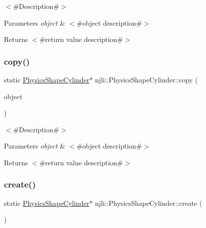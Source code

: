 $<$\#\+Description\#$>$


\begin{DoxyParams}{Parameters}
{\em object} & $<$\#object description\#$>$\\
\hline
\end{DoxyParams}
\begin{DoxyReturn}{Returns}
$<$\#return value description\#$>$ 
\end{DoxyReturn}
\mbox{\label{classnjli_1_1_physics_shape_cylinder_a0f46fea25774f8b6c9b5f11b662e2ea6}} 
\subsubsection{\texorpdfstring{copy()}{copy()}}
{\footnotesize\ttfamily static \mbox{\hyperlink{classnjli_1_1_physics_shape_cylinder}{Physics\+Shape\+Cylinder}}$\ast$ njli\+::\+Physics\+Shape\+Cylinder\+::copy (\begin{DoxyParamCaption}\item[{const \mbox{\hyperlink{classnjli_1_1_physics_shape_cylinder}{Physics\+Shape\+Cylinder}} \&}]{object }\end{DoxyParamCaption})\hspace{0.3cm}{\ttfamily [static]}}

$<$\#\+Description\#$>$


\begin{DoxyParams}{Parameters}
{\em object} & $<$\#object description\#$>$\\
\hline
\end{DoxyParams}
\begin{DoxyReturn}{Returns}
$<$\#return value description\#$>$ 
\end{DoxyReturn}
\mbox{\label{classnjli_1_1_physics_shape_cylinder_a1c47189018afd4ce17ebc2628ccf4288}} 
\subsubsection{\texorpdfstring{create()}{create()}\hspace{0.1cm}{\footnotesize\ttfamily [1/2]}}
{\footnotesize\ttfamily static \mbox{\hyperlink{classnjli_1_1_physics_shape_cylinder}{Physics\+Shape\+Cylinder}}$\ast$ njli\+::\+Physics\+Shape\+Cylinder\+::create (\begin{DoxyParamCaption}{ }\end{DoxyParamCaption})\hspace{0.3cm}{\ttfamily [static]}}

